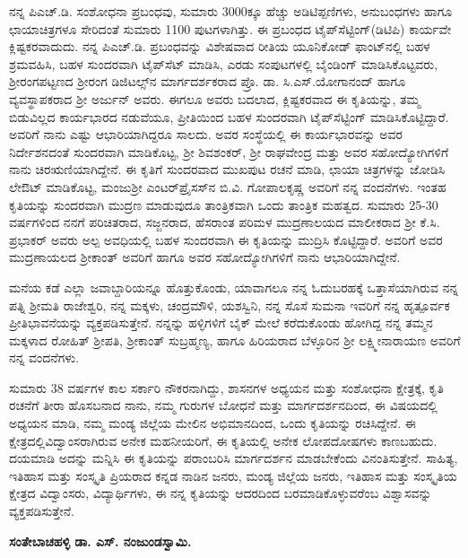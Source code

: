 ನನ್ನ ಪಿಎಚ್​.ಡಿ. ಸಂಶೋಧನಾ ಪ್ರಬಂಧವು, ಸುಮಾರು 3000ಕ್ಕೂ ಹೆಚ್ಚು ಅಡಿಟಿಪ್ಪಣಿಗಳು, ಅನುಬಂಧಗಳು ಹಾಗೂ ಛಾಯಾಚಿತ್ರಗಳೂ ಸೇರಿದಂತೆ ಸುಮಾರು 1100 ಪುಟಗಳಾಗಿತ್ತು. ಈ ಪ್ರಬಂಧದ ಟೈಪ್​ಸೆಟ್ಟಿಂಗ್​(ಡಿಟಿಪಿ) ಕಾರ್ಯವೇ ಕ್ಲಿಷ್ಟಕರವಾದುದು. ನನ್ನ ಪಿಎಚ್​.ಡಿ. ಪ್ರಬಂಧವನ್ನು ವಿಶೇಷವಾದ ರೀತಿಯ ಯೂನಿಕೋಡ್​ ಫಾಂಟ್​ನಲ್ಲಿ ಬಹಳ ಶ್ರಮ\-ವಹಿಸಿ, ಬಹಳ ಸುಂದರವಾಗಿ ಟೈಪ್​ಸೆಟ್​ ಮಾಡಿಸಿ, ಎರಡು ಸಂಪುಟಗಳಲ್ಲಿ ಬೈಂಡಿಂಗ್​ ಮಾಡಿಸಿಕೊಟ್ಟವರು, ಶ‍್ರೀರಂಗಪಟ್ಟಣದ ಶ‍್ರೀರಂಗ ಡಿಜಿಟಲ್ಸ್​ನ ಮಾರ್ಗದರ್ಶಕರಾದ ಪ್ರೊ. ಡಾ. ಸಿ.ಎಸ್​.ಯೋಗಾನಂದ್​ ಹಾಗೂ ವ್ಯವಸ್ಥಾಪಕರಾದ ಶ‍್ರೀ ಅರ್ಜುನ್​ ಅವರು. ಈಗಲೂ ಅವರು ಬದಲಾದ, ಕ್ಲಿಷ್ಟಕರವಾದ ಈ ಕೃತಿಯನ್ನು, ತಮ್ಮ ಬಿಡುವಿಲ್ಲದ ಕಾರ್ಯಭಾರದ ನಡುವೆಯೂ, ಪ್ರೀತಿಯಿಂದ ಬಹಳ ಸುಂದರವಾಗಿ ಟೈಪ್​ಸೆಟ್ಟಿಂಗ್​ ಮಾಡಿಸಿಕೊಟ್ಟಿದ್ದಾರೆ. ಅವರಿಗೆ ನಾನು ಎಷ್ಟು ಆಭಾರಿ\-ಯಾಗಿದ್ದರೂ ಸಾಲದು. ಅವರ ಸಂಸ್ಥೆಯಲ್ಲಿ ಈ ಕಾರ್ಯಭಾರವನ್ನು ಅವರ ನಿರ್ದೇಶನದಂತೆ ಸುಂದರವಾಗಿ ಮಾಡಿಕೊಟ್ಟ, ಶ‍್ರೀ ಶಿವಶಂಕರ್​, ಶ‍್ರೀ ರಾಘವೇಂದ್ರ ಮತ್ತು ಅವರ ಸಹೋದ್ಯೋಗಿಗಳಿಗೆ ನಾನು ಚಿರಋಣಿಯಾಗಿದ್ದೇನೆ. ಈ ಕೃತಿಗೆ ಸುಂದರವಾದ ಮುಖಪುಟ ರಚನೆ ಮಾಡಿ, ಛಾಯಾ ಚಿತ್ರಗಳನ್ನು ಜೋಡಿಸಿ ಲೇಔಟ್​ ಮಾಡಿಕೊಟ್ಟ, ಮಂಜುಶ‍್ರೀ ಎಂಟರ್​\-ಪ್ರೈಸಸ್​ನ ಬಿ.ವಿ. ಗೋಪಾಲಕೃಷ್ಣ ಅವರಿಗೆ ನನ್ನ ವಂದನೆಗಳು. ಇಂತಹ ಕೃತಿಯನ್ನು ಸುಂದರವಾಗಿ ಮುದ್ರಣ ಮಾಡುವುದೂ ತಾಂತ್ರಿಕವಾಗಿ ಒಂದು ತಾಂತ್ರಿಕ ಮಹತ್ವದ. ಸುಮಾರು 25-30 ವರ್ಷಗಳಿಂದ ನನಗೆ ಪರಿಚಿತರಾದ, ಸಜ್ಜನರಾದ, ಹೆಸರಾಂತ ಪರಿಮಳ ಮುದ್ರಣಾಲಯದ ಮಾಲೀಕರಾದ ಶ‍್ರೀ ಕೆ.ಸಿ. ಪ್ರಭಾಕರ್​ ಅವರು ಅಲ್ಪ ಅವಧಿಯಲ್ಲಿ ಬಹಳ ಸುಂದರವಾಗಿ ಈ ಕೃತಿಯನ್ನು ಮುದ್ರಿಸಿ ಕೊಟ್ಟಿದ್ದಾರೆ. ಅವರಿಗೆ ಅವರ ಮುದ್ರಣಾಯಲದ ಶ‍್ರೀಕಾಂತ್​ ಅವರಿಗೆ ಹಾಗೂ ಅವರ ಸಹೋದ್ಯೋಗಿ\-ಗಳಿಗೆ ನಾನು ಆಭಾರಿಯಾಗಿದ್ದೇನೆ.

ಮನೆಯ ಕಡೆ ಎಲ್ಲಾ ಜವಾಬ್ದಾರಿಯನ್ನೂ ಹೊತ್ತುಕೊಂಡು, ಯಾವಾಗಲೂ ನನ್ನ ಓದುಬರಹಕ್ಕೆ ಒತ್ತಾಸೆಯಾಗಿರುವ ನನ್ನ ಪತ್ನಿ ಶ‍್ರೀಮತಿ ರಾಜೇಶ್ವರಿ, ನನ್ನ ಮಕ್ಕಳು, ಚಂದ್ರಮೌಳಿ, ಯಶಸ್ವಿನಿ, ನನ್ನ ಸೊಸೆ ಸುಮನಾ ಇವರಿಗೆ ನನ್ನ ಹೃತ್ಪೂರ್ವಕ ಪ್ರೀತಿಭಾವನೆಯನ್ನು ವ್ಯಕ್ತಪಡಿಸುತ್ತೇನೆ. ನನ್ನನ್ನು ಹಳ್ಳಿಗಳಿಗೆ ಬೈಕ್​ ಮೇಲೆ ಕರೆದುಕೊಂಡು ಹೋಗಿದ್ದ ನನ್ನ ತಮ್ಮನ ಮಕ್ಕಳಾದ ರೋಹಿತ್​ ಶ‍್ರೀಪತಿ, ಶ‍್ರೀಕಾಂತ್​ ಸುಬ್ರಹ್ಮಣ್ಯ, ಹಾಗೂ ಹಿರಿಯರಾದ ಬೆಳ್ಳೂರಿನ ಶ‍್ರೀ ಲಕ್ಷ್ಮೀನಾರಾಯಣ ಅವರಿಗೆ ನನ್ನ ವಂದನೆಗಳು.

ಸುಮಾರು 38 ವರ್ಷಗಳ ಕಾಲ ಸರ್ಕಾರಿ ನೌಕರನಾಗಿದ್ದು, ಶಾಸನಗಳ ಅಧ್ಯಯನ ಮತ್ತು ಸಂಶೋಧನಾ ಕ್ಷೇತ್ರಕ್ಕೆ, ಕೃತಿ ರಚನೆಗೆ ತೀರಾ ಹೊಸಬನಾದ ನಾನು, ನಮ್ಮ ಗುರುಗಳ ಬೋಧನೆ ಮತ್ತು ಮಾರ್ಗದರ್ಶನದಿಂದ, ಈ ವಿಷಯದಲ್ಲಿ ಅಧ್ಯಯನ ಮಾಡಿ, ನಮ್ಮ ಮಂಡ್ಯ ಜಿಲ್ಲೆಯ ಮೇಲಿನ ಅಭಿಮಾನದಿಂದ, ಒಂದು ಕೃತಿಯನ್ನು ರಚಿಸಿದ್ದೇನೆ. ಈ ಕ್ಷೇತ್ರದಲ್ಲಿ\break ವಿದ್ವಾಂಸರಾಗಿರುವ ಅನೇಕ ಮಹನೀಯರಿಗೆ, ಈ ಕೃತಿಯಲ್ಲಿ ಅನೇಕ ಲೋಪದೋಷಗಳು ಕಾಣಬಹುದು. ದಯಮಾಡಿ ಅದನ್ನು ಮನ್ನಿಸಿ ಈ ಕೃತಿಯನ್ನು ಪರಾಂಬರಿಸಿ ಮಾರ್ಗದರ್ಶನ ಮಾಡಬೇಕೆಂದು ವಿನಂತಿಸುತ್ತೇನೆ. ಸಾಹಿತ್ಯ, ಇತಿಹಾಸ ಮತ್ತು ಸಂಸ್ಕೃತಿ ಪ್ರಿಯರಾದ ಕನ್ನಡ ನಾಡಿನ ಜನರು, ಮಂಡ್ಯ ಜಿಲ್ಲೆಯ ಜನರು, ಇತಿಹಾಸ ಮತ್ತು ಸಂಸ್ಕೃತಿಯ ಕ್ಷೇತ್ರದ ವಿದ್ವಾಂಸರು, ವಿದ್ಯಾರ್ಥಿಗಳು, ಈ ನನ್ನ ಕೃತಿಯನ್ನು ಆದರದಿಂದ ಬರಮಾಡಿಕೊಳ್ಳುವರೆಂಬ ವಿಶ್ವಾಸವನ್ನು ವ್ಯಕ್ತಪಡಿಸುತ್ತೇನೆ.

\begin{flushright}
\textbf{ಸಂತೇಬಾಚಹಳ್ಳಿ ಡಾ. ಎಸ್​. ನಂಜುಂಡಸ್ವಾಮಿ.}
\end{flushright}

